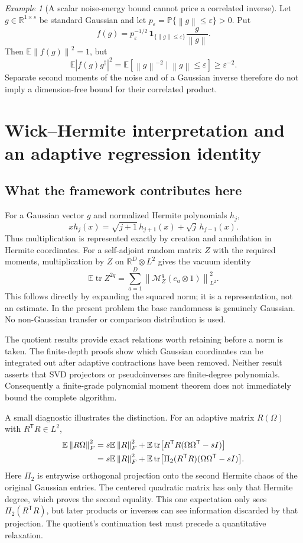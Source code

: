 \documentclass[11pt,oneside,openany,a4paper]{book}
\numberwithin{equation}{chapter}
\theoremstyle{definition}
\theoremstyle{remark}
\newtheorem{example}[theorem]{Example}
\newcommand{\R}{\mathbb R}\newcommand{\E}{\mathbb E}\newcommand{\Prb}{\mathbb P}\newcommand{\PP}{\mathbb P}
\newcommand{\T}{\mathsf T}\newcommand{\Id}{I}
\newcommand{\F}[1]{\left\lVert#1\right\rVert_F}
\newcommand{\N}[1]{\left\lVert#1\right\rVert}
\DeclareMathOperator{\tr}{tr}\DeclareMathOperator{\rank}{rank}
\begin{document}
\begin{example}[A scalar noise-energy bound cannot price a correlated inverse]
\label{base:ex:correlated-inverse}
Let $g\in\R^{1\times s}$ be standard Gaussian and let
$p_\varepsilon=\Prb\{\N g\le\varepsilon\}>0$. Put
\[
 f(g)=p_\varepsilon^{-1/2}\,
      \mathbf1_{\{\N g\le\varepsilon\}}\frac{g}{\N g}.
\]
Then $\E\N{f(g)}^2=1$, but
\[
 \E|f(g)g^\dagger|^2
 =\E[\N g^{-2}\mid\N g\le\varepsilon]\ge\varepsilon^{-2}.
\]
Separate second moments of the noise and of a Gaussian inverse therefore
do not imply a dimension-free bound for their correlated product.
\end{example}

\section{Wick--Hermite interpretation and an adaptive regression identity}
\label{base:sec:stein}
\subsection{What the framework contributes here}
For a Gaussian vector $g$ and normalized Hermite polynomials $h_j$,
\[
 xh_j(x)=\sqrt{j+1}\,h_{j+1}(x)+\sqrt j\,h_{j-1}(x).
\]
Thus multiplication is represented exactly by creation and annihilation in
Hermite coordinates. For a self-adjoint random matrix $Z$ with the required
moments, multiplication by $Z$ on $\R^D\otimes L^2$ gives the vacuum identity
\begin{equation}\label{base:eq:vacuum}
 \E\tr Z^{2q}
 =\sum_{a=1}^D\N{\mathcal M_Z^q(e_a\otimes1)}_{L^2}^{2}.
\end{equation}
This follows directly by expanding the squared norm; it is a representation,
not an estimate. In the present problem the base randomness is genuinely
Gaussian. No non-Gaussian transfer or comparison distribution is used.

The quotient results provide exact relations worth retaining before a norm
is taken. The finite-depth proofs show which Gaussian coordinates can be
integrated out after adaptive contractions have been removed. Neither result
asserts that SVD projectors or pseudoinverses are finite-degree polynomials.
Consequently a finite-grade polynomial moment theorem does not immediately
bound the complete algorithm.

A small diagnostic illustrates the distinction. For an adaptive matrix
$R(\Omega)$ with $R^{\T}R\in L^2$,
\begin{align}
 \E\F{R\Omega}^2
 ={}&s\E\F R^2
   +\E\tr\bigl[R^{\T}R(\Omega\Omega^{\T}-sI)\bigr]\notag\\
 ={}&s\E\F R^2
   +\E\tr\bigl[\Pi_2(R^{\T}R)(\Omega\Omega^{\T}-sI)\bigr].
                                                        \label{base:eq:second-chaos}
\end{align}
Here $\Pi_2$ is entrywise orthogonal projection onto the second Hermite
chaos of the original Gaussian entries. The centered quadratic matrix has
only that Hermite degree, which proves the second equality. This one
expectation only sees $\Pi_2(R^{\T}R)$, but later products or inverses can see
information discarded by that projection. The quotient's continuation test
must precede a quantitative relaxation.
\end{document}
